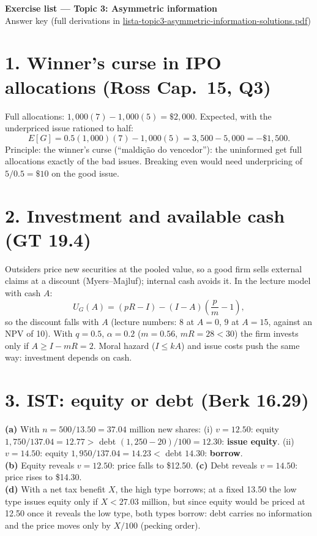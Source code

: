 \documentclass[11pt,a4paper]{article}
\newcommand{\pt}{\foreignlanguage{brazilian}}
\begin{document}
\begin{center}{\Large\bfseries Exercise list --- Topic 3: Asymmetric information}\\[4pt]{\large Answer key (full derivations in \url{lista-topic3-asymmetric-information-solutions.pdf})}\end{center}

\section*{1. Winner's curse in IPO allocations (Ross Cap.~15, Q3)}
Full allocations: $1{,}000(7)-1{,}000(5)=\$2{,}000$. Expected, with the underpriced issue rationed to half:
$$E[G]=0.5(1{,}000)(7)-1{,}000(5)=3{,}500-5{,}000=-\$1{,}500 .$$
Principle: the winner's curse (\pt{``maldi\c{c}\~ao do vencedor''}): the uninformed get full allocations exactly of the bad issues. Breaking even would need underpricing of $5/0.5=\$10$ on the good issue.

\section*{2. Investment and available cash (GT 19.4)}
Outsiders price new securities at the pooled value, so a good firm sells external claims at a discount (Myers--Majluf); internal cash avoids it. In the lecture model with cash $A$:
$$U_G(A)=(pR-I)-(I-A)\left(\frac{p}{m}-1\right),$$
so the discount falls with $A$ (lecture numbers: $8$ at $A=0$, $9$ at $A=15$, against an NPV of 10). With $q=0.5$, $\alpha=0.2$ ($m=0.56$, $mR=28<30$) the firm invests only if $A\ge I-mR=2$. Moral hazard ($I\le kA$) and issue costs push the same way: investment depends on cash.

\section*{3. IST: equity or debt (Berk 16.29)}
\textbf{(a)} With $n=500/13.50=37.04$ million new shares: (i) $v=12.50$: equity $1{,}750/137.04=12.77>$ debt $(1{,}250-20)/100=12.30$: \textbf{issue equity}. (ii) $v=14.50$: equity $1{,}950/137.04=14.23<$ debt $14.30$: \textbf{borrow}.\\
\textbf{(b)} Equity reveals $v=12.50$: price falls to \$12.50. \textbf{(c)} Debt reveals $v=14.50$: price rises to \$14.30.\\
\textbf{(d)} With a net tax benefit $X$, the high type borrows; at a fixed 13.50 the low type issues equity only if $X<27.03$ million, but since equity would be priced at 12.50 once it reveals the low type, both types borrow: debt carries no information and the price moves only by $X/100$ (pecking order).
\end{document}
